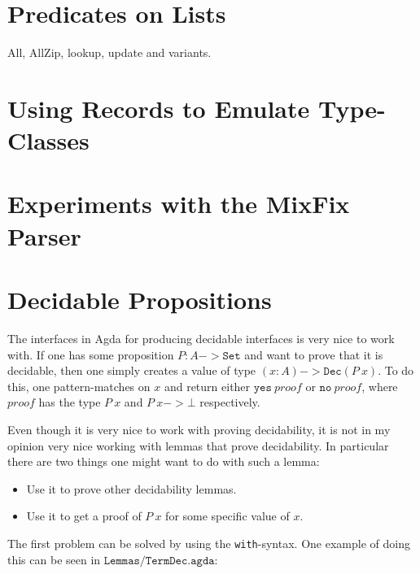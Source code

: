 \section{Predicates on Lists}
All, AllZip, lookup, update and variants.

\section{Using Records to Emulate Type-Classes}

\section{Experiments with the MixFix Parser}

\section{Decidable Propositions}

The interfaces in Agda for producing decidable interfaces is very nice to work
with. If one has some proposition $P : A -> \mathtt{Set}$ and want to prove that
it is decidable, then one simply creates a value of type
$(x : A) -> \mathtt{Dec} (P\ x)$. To do this, one pattern-matches on $x$ and
return either $\mathtt{yes}\ proof$ or $\mathtt{no}\ proof$, where $proof$ has
the type $P\ x$ and $P\ x -> \bot$ respectively.

Even though it is very nice to work with proving decidability, it is not in my
opinion very nice working with lemmas that prove decidability. In particular
there are two things one might want to do with such a lemma:

\begin{itemize}
\item Use it to prove other decidability lemmas.
\item Use it to get a proof of $P\ x$ for some specific value of $x$.
\end{itemize}

The first problem can be solved by using the \texttt{with}-syntax. One example
of doing this can be seen in $\texttt{Lemmas/TermDec.agda}$:

